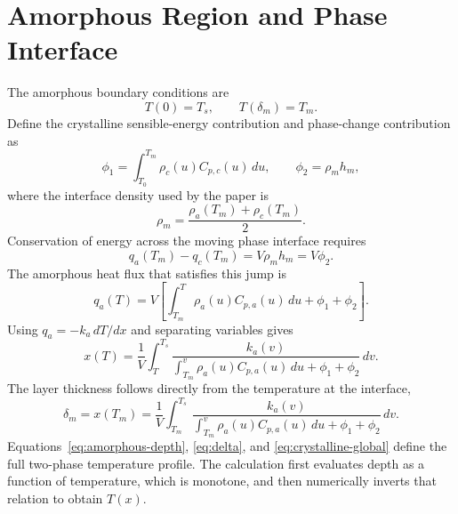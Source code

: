 \documentclass[11pt]{article}
\begin{document}
\section{Amorphous Region and Phase Interface}
The amorphous boundary conditions are
\begin{equation}
 T(0)=T_s,
 \qquad
 T(\delta_m)=T_m.
 \label{eq:amorphous-bc}
\end{equation}
Define the crystalline sensible-energy contribution and phase-change
contribution as
\begin{equation}
 \phi_1=\int_{T_0}^{T_m}\rho_c(u)C_{p,c}(u)\,du,
 \qquad
 \phi_2=\rho_mh_m,
 \label{eq:phi}
\end{equation}
where the interface density used by the paper is
\begin{equation}
 \rho_m=\frac{\rho_a(T_m)+\rho_c(T_m)}{2}.
 \label{eq:interface-density}
\end{equation}
Conservation of energy across the moving phase interface requires
\begin{equation}
 q_a(T_m)-q_c(T_m)=V\rho_mh_m=V\phi_2.
 \label{eq:flux-jump}
\end{equation}
The amorphous heat flux that satisfies this jump is
\begin{equation}
 q_a(T)=V\left[
 \int_{T_m}^{T}\rho_a(u)C_{p,a}(u)\,du+\phi_1+\phi_2
 \right].
 \label{eq:amorphous-flux}
\end{equation}
Using $q_a=-k_a\,dT/dx$ and separating variables gives
\begin{equation}
 x(T)=\frac{1}{V}\int_T^{T_s}
 \frac{k_a(v)}{\displaystyle
 \int_{T_m}^{v}\rho_a(u)C_{p,a}(u)\,du+\phi_1+\phi_2}\,dv.
 \label{eq:amorphous-depth}
\end{equation}
The layer thickness follows directly from the temperature at the interface,
\begin{equation}
 \delta_m=x(T_m)
 =\frac{1}{V}\int_{T_m}^{T_s}
 \frac{k_a(v)}{\displaystyle
 \int_{T_m}^{v}\rho_a(u)C_{p,a}(u)\,du+\phi_1+\phi_2}\,dv.
 \label{eq:delta}
\end{equation}
Equations~\eqref{eq:amorphous-depth}, \eqref{eq:delta}, and
\eqref{eq:crystalline-global} define the full two-phase temperature profile.
The calculation first evaluates depth as a function of temperature, which is
monotone, and then numerically inverts that relation to obtain $T(x)$.
\end{document}
